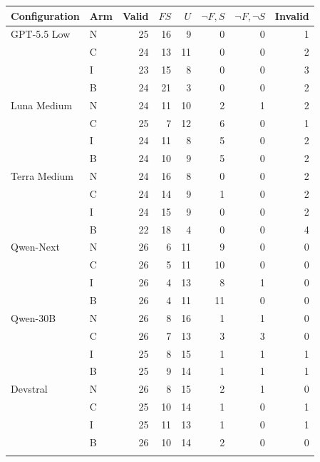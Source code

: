 \begin{tabular}{llrrrrrr}
\toprule
Configuration & Arm & Valid & $F S$ & $U$ & $\neg F,S$ & $\neg F,\neg S$ & Invalid\\
\midrule
GPT-5.5 Low & N & 25 & 16 & 9 & 0 & 0 & 1\\
 & C & 24 & 13 & 11 & 0 & 0 & 2\\
 & I & 23 & 15 & 8 & 0 & 0 & 3\\
 & B & 24 & 21 & 3 & 0 & 0 & 2\\
\addlinespace
Luna Medium & N & 24 & 11 & 10 & 2 & 1 & 2\\
 & C & 25 & 7 & 12 & 6 & 0 & 1\\
 & I & 24 & 11 & 8 & 5 & 0 & 2\\
 & B & 24 & 10 & 9 & 5 & 0 & 2\\
\addlinespace
Terra Medium & N & 24 & 16 & 8 & 0 & 0 & 2\\
 & C & 24 & 14 & 9 & 1 & 0 & 2\\
 & I & 24 & 15 & 9 & 0 & 0 & 2\\
 & B & 22 & 18 & 4 & 0 & 0 & 4\\
\addlinespace
Qwen-Next & N & 26 & 6 & 11 & 9 & 0 & 0\\
 & C & 26 & 5 & 11 & 10 & 0 & 0\\
 & I & 26 & 4 & 13 & 8 & 1 & 0\\
 & B & 26 & 4 & 11 & 11 & 0 & 0\\
\addlinespace
Qwen-30B & N & 26 & 8 & 16 & 1 & 1 & 0\\
 & C & 26 & 7 & 13 & 3 & 3 & 0\\
 & I & 25 & 8 & 15 & 1 & 1 & 1\\
 & B & 25 & 9 & 14 & 1 & 1 & 1\\
\addlinespace
Devstral & N & 26 & 8 & 15 & 2 & 1 & 0\\
 & C & 25 & 10 & 14 & 1 & 0 & 1\\
 & I & 25 & 11 & 13 & 1 & 0 & 1\\
 & B & 26 & 10 & 14 & 2 & 0 & 0\\
\addlinespace
\bottomrule
\end{tabular}
